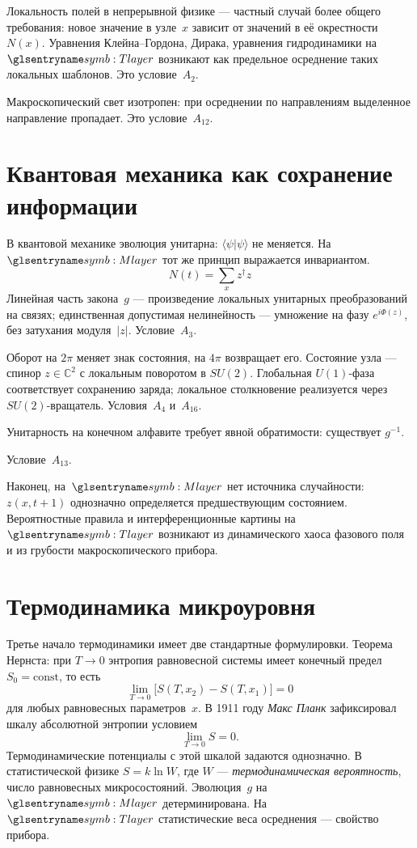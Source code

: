 Локальность полей в непрерывной физике --- частный случай более общего требования:
новое значение в узле~$x$ зависит от значений в её окрестности~$N(x)$.
Уравнения Клейна--Гордона, Дирака, уравнения гидродинамики на~$\layerMacro$ возникают как предельное
осреднение таких локальных шаблонов.
Это условие~$A_2$.

Макроскопический свет изотропен:
при осреднении по направлениям выделенное направление пропадает.
Это условие~$A_{12}$.

\section{Квантовая механика как сохранение информации}

В квантовой механике эволюция унитарна: $\langle\psi|\psi\rangle$ не меняется.
На~$\layerMicro$ тот же принцип выражается инвариантом.
\[
N(t)=\sum_x z^\dagger z
\]
Линейная часть закона~$g$ --- произведение локальных унитарных преобразований на связях;
единственная допустимая нелинейность --- умножение на фазу $e^{i\Phi(z)}$, без затухания модуля~$|z|$.
Условие~$A_3$.

Оборот на $2\pi$ меняет знак состояния, на $4\pi$ возвращает его.
Состояние узла --- спинор $z\in\mathbb{C}^2$ с локальным поворотом в $SU(2)$.
Глобальная $U(1)$-фаза соответствует сохранению заряда; локальное столкновение реализуется
через $SU(2)$-вращатель.
Условия~$A_4$ и~$A_{16}$.

Унитарность на конечном алфавите требует явной обратимости: существует $g^{-1}$.

Условие~$A_{13}$.

Наконец, на~$\layerMicro$ нет источника случайности: $z(x,t+1)$ однозначно определяется
предшествующим состоянием.
Вероятностные правила и интерференционные картины на~$\layerMacro$ возникают из динамического хаоса
фазового поля и из грубости макроскопического прибора.

\section{Термодинамика микроуровня}

Третье начало термодинамики имеет две стандартные формулировки.
Теорема Нернста: при $T\to 0$ энтропия равновесной системы имеет конечный предел
$S_0=\mathrm{const}$, то есть
\[
  \lim_{T\to 0}\bigl[S(T,x_2)-S(T,x_1)\bigr]=0
\]
для любых равновесных параметров~$x$.
В 1911 году \emph{Макс Планк} зафиксировал шкалу абсолютной энтропии условием
\[
  \lim_{T\to 0} S = 0.
\]
Термодинамические потенциалы с этой шкалой задаются однозначно.
В статистической физике $S=k\ln W$, где $W$ --- \emph{термодинамическая вероятность},
число равновесных микросостояний.
Эволюция~$g$ на~$\layerMicro$ детерминирована.
На~$\layerMacro$ статистические веса осреднения --- свойство прибора.

